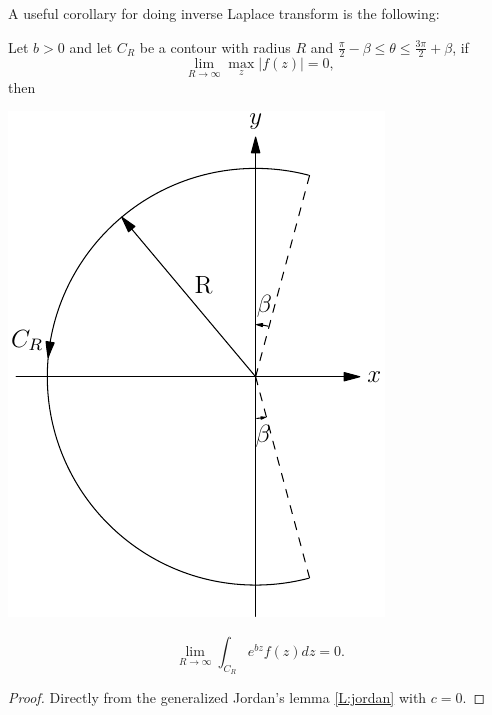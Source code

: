 A useful corollary for doing inverse Laplace transform is the following:
\begin{corollary} \label{C:jordan}
Let $b>0$ and let $C_R$ be a contour with radius $R$ and 
$\frac{\pi}{2}-\beta \le \theta \le \frac{3\pi}{2}+\beta$, 
if 
\[
	\lim_{R\to\infty} \max_z |f(z)| = 0,
\]
then

\begin{marginfigure} \label{F:cont_jordan2}
  \includegraphics{graphics/contour_jordan2.pdf}
\end{marginfigure}

\[
  \lim_{R\to \infty} \int_{C_R} e^{b z} f(z) dz = 0.
\]
\end{corollary}
\begin{proof}
	Directly from the generalized Jordan's lemma \ref{L:jordan} with $c=0$.
\end{proof}




